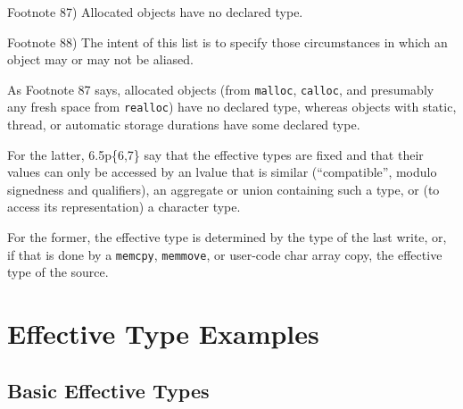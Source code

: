 \documentclass[12pt,acmsmall,review,screen]{acmart}\settopmatter{printfolios=true,printccs=false,printacmref=false}
\begin{document}
\noindent
Footnote 87) Allocated objects have no declared type.

\noindent
Footnote 88) The intent of this list is to specify those circumstances
in which an object may or may not be aliased.


\medskip

As Footnote 87 says, allocated objects (from \lstinline{malloc},
\lstinline{calloc}, and presumably any fresh space from \lstinline{realloc}) have no declared type, whereas
objects with static, thread, or automatic storage durations have some
declared type.  

For the latter, 6.5p\{6,7\} say that the effective
types are fixed and that their values can only be accessed by an
lvalue that is similar (``compatible'', modulo signedness and
qualifiers), an aggregate or union containing such a type, or (to
access its representation) a character type. 

For the former, the effective type is determined by the type of
the last write, or, if that is done by a \lstinline{memcpy},
\lstinline{memmove}, or user-code char array copy, the effective type of
the source. 




% 
% 

\section{Effective Type Examples}

\subsection{Basic Effective Types}
\end{document}
